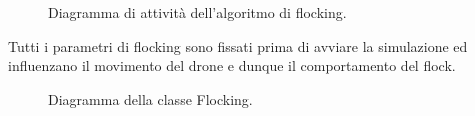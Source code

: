 \begin{figure}[H] 
    \captionsetup{justification=centering, margin=2cm, font=footnotesize}
    \begin{center}
    \end{center}
    \caption{Diagramma di attività dell'algoritmo di flocking.}
    \label{activity_flocking}
\end{figure}

Tutti i parametri di flocking sono fissati prima di avviare la simulazione ed influenzano il movimento del drone e dunque il comportamento del flock.

\begin{figure}[H] 
    \captionsetup{justification=centering, margin=2cm, font=footnotesize}
    \begin{center}
    \end{center}
    \caption{Diagramma della classe Flocking.}
    \label{classe_flocking}
\end{figure}


